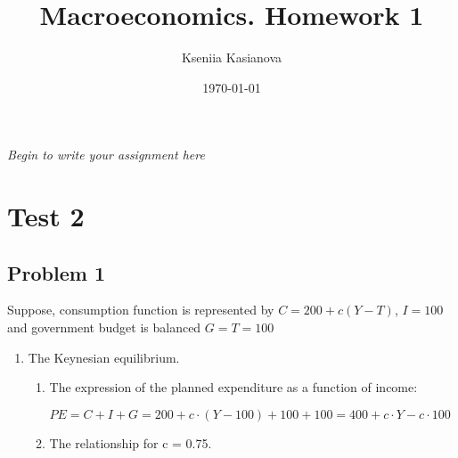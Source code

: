 \documentclass[a4paper,12pt]{article} %
\author{Kseniia Kasianova}
\title{Macroeconomics. Homework 1}
\date{\today}
\newcommand{\latinword}[1]{\textsf{\itshape #1}}
\begin{document}
{\color{blue} \latinword{Begin to write your assignment here}}

\noindent\makebox[\linewidth]{\rule{\textwidth}{0.4pt}}


\section*{Test 2}
\subsection*{Problem 1}

Suppose, consumption function is represented by $ C = 200 + c(Y - T)$, $ I = 100 $ and government budget is balanced $G = T = 100 $


\begin{enumerate} 
	\item 
	The Keynesian equilibrium.

 \begin{enumerate} [label=\arabic*)] 
		
	\item 
	The expression of the planned expenditure as a function of income:

	$ PE = C + I + G = 200 + c\cdot (Y - 100) + 100 + 100 = 400 + c\cdot Y - c \cdot 100
 $

\item The relationship for c = 0.75. 


\end{enumerate}
\end{enumerate}
\end{document}
